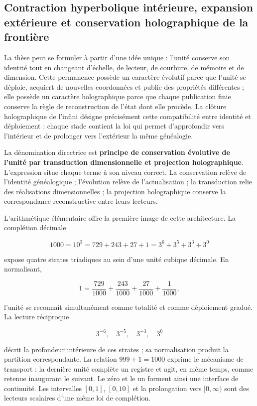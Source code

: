 \subsection{Contraction hyperbolique intérieure, expansion extérieure et conservation holographique de la frontière}

La thèse peut se formuler à partir d'une idée unique : l'unité conserve son identité tout en changeant d'échelle, de lecteur, de courbure, de mémoire et de dimension. Cette permanence possède un caractère évolutif parce que l'unité se déploie, acquiert de nouvelles coordonnées et publie des propriétés différentes ; elle possède un caractère holographique parce que chaque publication finie conserve la règle de reconstruction de l'état dont elle procède. La clôture holographique de l'infini désigne précisément cette compatibilité entre identité et déploiement : chaque stade contient la loi qui permet d'approfondir vers l'intérieur et de prolonger vers l'extérieur la même généalogie.

La dénomination directrice est \textbf{principe de conservation évolutive de l'unité par transduction dimensionnelle et projection holographique}. L'expression situe chaque terme à son niveau correct. La conservation relève de l'identité généalogique ; l'évolution relève de l'actualisation ; la transduction relie des réalisations dimensionnelles ; la projection holographique conserve la correspondance reconstructive entre leurs lecteurs.

L'arithmétique élémentaire offre la première image de cette architecture. La complétion décimale

\[
1000=10^3=729+243+27+1=3^6+3^5+3^3+3^0
\]

expose quatre strates triadiques au sein d'une unité cubique décimale. En normalisant,

\[
1=\frac{729}{1000}+\frac{243}{1000}+\frac{27}{1000}+\frac{1}{1000},
\]

l'unité se reconnaît simultanément comme totalité et comme déploiement gradué. La lecture réciproque

\[
3^{-6},\quad 3^{-5},\quad 3^{-3},\quad 3^0
\]

décrit la profondeur intérieure de ces strates ; sa normalisation produit la partition correspondante. La relation \(999+1=1000\) exprime le mécanisme de transport : la dernière unité complète un registre et agit, en même temps, comme retenue inaugurant le suivant. Le zéro et le un forment ainsi une interface de continuité. Les intervalles \([0,1]\), \([0,10]\) et la prolongation vers \([0,\infty)\) sont des lecteurs scalaires d'une même loi de complétion.


